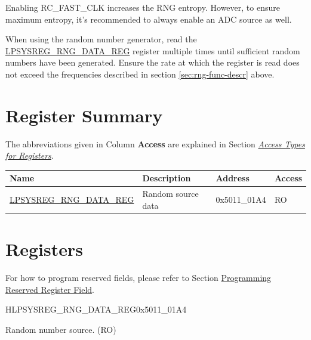 \documentclass[main\_\_EN.tex]{subfiles}
\begin{document}
\begin{tiplisting}\label{others:rng-note-clock-seed}
     Enabling RC\_FAST\_CLK increases the RNG entropy. However, to ensure maximum entropy, it's recommended to always enable an ADC source as well.
\end{tiplisting}

When using the random number generator, read the \hyperref[regdesc:LPSYSREGRNGDATAREG]{LPSYSREG\_RNG\_DATA\_REG} register multiple times until sufficient random numbers have been generated. Ensure the rate at which the register is read does not exceed the frequencies described in section \ref{sec:rng-func-descr} above.



\newpage
\hypertarget{rng-reg-summ}{}
\section{Register Summary}
\label{sec:rng-reg-summ}




The abbreviations given in Column \textbf{Access} are explained in Section \hyperref[glossary-access-types]{\textit{Access Types for Registers}}.

\begin{table}[H]
    \centering
    \setlength{\extrarowheight}{0.3em}
        \begin{tabular}{ | l | l | l | l | }
    \hline
    \rowcolor{lightgray}
    \textbf{Name} & \textbf{Description} & \textbf{Address} & \textbf{Access} \\ \hline
    \hyperref[regdesc:LPSYSREGRNGDATAREG]{LPSYSREG\_RNG\_DATA\_REG} & Random source data & 0x5011\_01A4 & RO \\ \hline
    \end{tabular}
\end{table}




\newpage
\section{Registers}


For how to program reserved fields, please refer to Section \hyperref[programming-reserved-field]{Programming Reserved Register Field}.

\begin{register}{H}{LPSYSREG\_RNG\_DATA\_REG}{0x5011\_01A4}\label{regdesc:LPSYSREGRNGDATAREG}
%
\regnewline%
\begin{regdesc}\begin{reglist}
\label{fielddesc:LPSYSREGRNGDATA}\item [LPSYSREG\_RNG\_DATA] Random number source. (RO)
\end{reglist}\end{regdesc}
\end{register}
\end{document}
